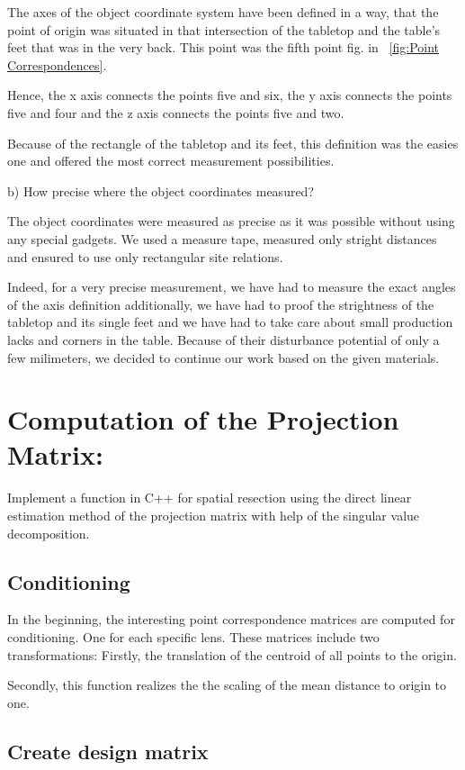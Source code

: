 \documentclass[a4paper,headings=small]{scrartcl}
\numberwithin{equation}{section} %
\numberwithin{figure}{section}   %
\begin{document}
The axes of the object coordinate system have been defined in a way,
that the point of origin was situated in that intersection of the tabletop and the table's feet
that was in the very back. This point was the fifth point fig. in ~\ref{fig:Point Correspondences}.

Hence, the x axis connects the points five and six,
the y axis connects the points five and four and
the z axis connects the points five and two.

Because of the rectangle of the tabletop and its feet,
this definition was the easies one and offered the most correct measurement possibilities.

b) How precise where the object coordinates measured?

The object coordinates were measured as precise as it was possible
without using any special gadgets. We used a measure tape,
measured only stright distances and ensured to use only rectangular site relations.

Indeed, for a very precise measurement, we have had to measure the exact angles 
of the axis definition additionally, we have had to proof the strightness
of the tabletop and its single feet and we have had to take care about small
production lacks and corners in the table. 
Because of their disturbance potential of only a few milimeters,
we decided to continue our work based on the given materials.

\section{Computation of the Projection Matrix:}

Implement a function in C++ for spatial resection using the direct linear
estimation method of the projection matrix with help of the singular value
decomposition.

  \subsection{Conditioning}

  In the beginning, the interesting point correspondence matrices are computed for conditioning.
  One for each specific lens.
  These matrices include two transformations: 
  Firstly, the translation of the centroid of all points to the origin.
  
  Secondly, this function realizes the the scaling of the mean distance to origin to one.

  \subsection{Create design matrix}
\end{document}
